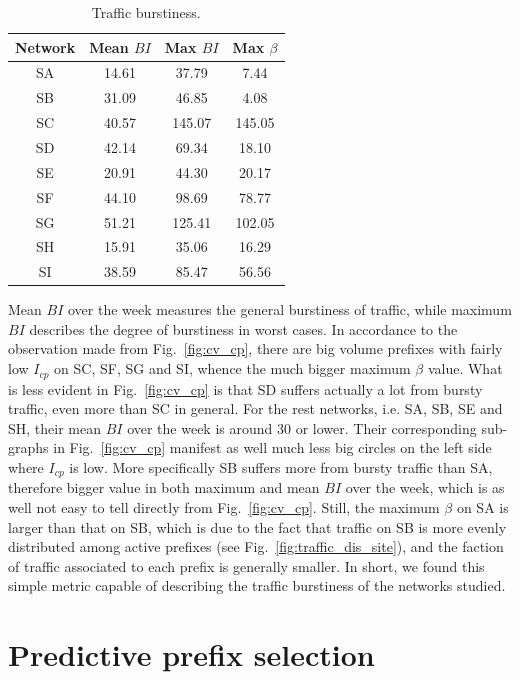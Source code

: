 \begin{table}[!htb]
\centering
\footnotesize
\begin{tabular}{cccc}\toprule
\textbf{Network} & \textbf{Mean $BI$} & \textbf{Max $BI$} & \textbf{Max $\beta$}\\
\midrule
SA & 14.61 & 37.79  &  7.44\\
SB & 31.09 & 46.85  &  4.08\\
SC & 40.57 & 145.07 &  145.05\\
SD & 42.14 & 69.34  &  18.10\\
SE & 20.91 & 44.30  &  20.17\\
SF & 44.10 & 98.69  &  78.77\\
SG & 51.21 & 125.41 &  102.05\\
SH & 15.91 & 35.06  &  16.29\\
SI & 38.59 & 85.47  &  56.56\\
\bottomrule
\end{tabular}
\caption{Traffic burstiness.}
\label{tab:bi}
\end{table}

Mean $BI$ over the week measures the general burstiness of traffic, while maximum $BI$ describes the degree of burstiness in worst cases.
In accordance to the observation made from Fig.~\ref{fig:cv_cp}, there are big volume prefixes with fairly low $I_{cp}$ on SC, SF, SG and SI, whence the much bigger maximum $\beta$ value.
What is less evident in Fig.~\ref{fig:cv_cp} is that SD suffers actually a lot from bursty traffic, even more than SC in general.
For the rest networks, i.e. SA, SB, SE and SH, their mean $BI$ over the week is around 30 or lower. Their corresponding sub-graphs in Fig.~\ref{fig:cv_cp} manifest as well much less big circles on the left side where $I_{cp}$ is low.
More specifically SB suffers more from bursty traffic than SA, therefore bigger value in both maximum and mean $BI$ over the week, which is as well not easy to tell directly from Fig.~\ref{fig:cv_cp}.
Still, the maximum $\beta$ on SA is larger than that on SB, which is due to the fact that traffic on SB is more evenly distributed among active prefixes (see Fig.~\ref{fig:traffic_dis_site}), and the faction of traffic associated to each prefix is generally smaller.
In short, we found this simple metric capable of describing the traffic burstiness of the networks studied.


\section{Predictive prefix selection}
\label{sec:sele}

